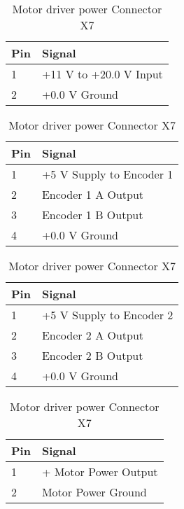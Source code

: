 \documentclass[11pt,a4paper]{article}
\begin{document}
  \begin{table}[h]
    \flushleft

    \begin{minipage}{0.45\textwidth}
      \begin{tabular}[b]{|p{7mm}|p{4.5cm}|}
        \hline \textbf{Pin} & \textbf{Signal}\\
        \hline 1 & +11 V to +20.0 V Input\\
        \hline 2 & +0.0 V Ground\\
        \hline
      \end{tabular}
      \caption{Connector X1}
      \vspace{25pt}
    \end{minipage}\hfill
    \begin{minipage}{0.45\textwidth}
      \begin{tabular}[b]{|p{7mm}|p{4.5cm}|}
        \hline \textbf{Pin} & \textbf{Signal}\\
        \hline  1 & +5 V Supply to Encoder 1\\
        \hline  2 & Encoder 1 A Output\\
        \hline  3 & Encoder 1 B Output\\
        \hline  4 & +0.0 V Ground\\
        \hline
      \end{tabular}
      \caption{Encoder 1 Connector X5}
      \vspace{25pt}
    \end{minipage}\hfill
    \begin{minipage}{0.45\textwidth}
      \begin{tabular}[b]{|p{7mm}|p{4.5cm}|}
        \hline \textbf{Pin} & \textbf{Signal}\\
        \hline 1 & +5 V Supply to Encoder 2\\
        \hline 2 & Encoder 2 A Output\\
        \hline 3 & Encoder 2 B Output\\
        \hline 4 & +0.0 V Ground \\
        \hline
      \end{tabular}
      \caption{Encoder 2 Connector X6}
      \vspace{25pt}
    \end{minipage}\hfill
    \begin{minipage}{0.45\textwidth}
      \begin{tabular}[b]{|p{7mm}|p{4.5cm}|}
        \hline \textbf{Pin} & \textbf{Signal}\\
        \hline 1 & + Motor Power Output\\
        \hline 2 & Motor Power Ground \\
        \hline
      \end{tabular}
      \caption{Motor driver power Connector X7}
    \end{minipage}\hfill
  \end{table}
\end{document}
